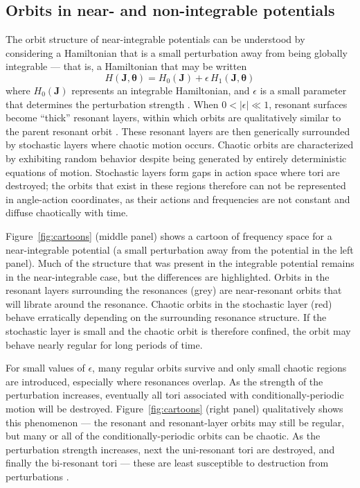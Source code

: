 \documentclass[letterpaper,12pt,preprint]{aastex}
\newcommand{\bs}[1]{\boldsymbol{#1}}
\begin{document}
\subsection{Orbits in near- and non-integrable potentials}

The orbit structure of near-integrable potentials can be understood by considering a Hamiltonian that is a small perturbation away from being globally integrable --- that is, a Hamiltonian that may be written
\begin{equation}
	H(\boldsymbol{J}, \boldsymbol{\theta}) = H_0(\boldsymbol{J}) + \epsilon \, H_1(\boldsymbol{J}, \boldsymbol{\theta})
\end{equation}
where $H_0(\bs{J})$ represents an integrable Hamiltonian, and $\epsilon$ is a small parameter that determines the perturbation strength \citep[a description of perturbation theory applied to nonlinear Hamiltonians is given in][]{lichtenberg83}. When $0 < |\epsilon| \ll 1$, resonant surfaces become ``thick'' resonant layers, within which orbits are qualitatively similar to the parent resonant orbit \citep[e.g.,][]{merritt99}. These resonant layers are then generically surrounded by stochastic layers where chaotic motion occurs. Chaotic orbits are characterized by exhibiting random behavior despite being generated by entirely deterministic equations of motion. Stochastic layers form gaps in action space where tori are destroyed; the orbits that exist in these regions therefore can not be represented in angle-action coordinates, as their actions and frequencies are not constant and diffuse chaotically with time. 

Figure~\ref{fig:cartoons} (middle panel) shows a cartoon of frequency space for a near-integrable potential (a small perturbation away from the potential in the left panel). Much of the structure that was present in the integrable potential remains in the near-integrable case, but the differences are highlighted. Orbits in the resonant layers surrounding the resonances (grey) are near-resonant orbits that will librate around the resonance. Chaotic orbits in the stochastic layer (red) behave erratically depending on the surrounding resonance structure. If the stochastic layer is small and the chaotic orbit is therefore confined, the orbit may behave nearly regular for long periods of time.

For small values of $\epsilon$, many regular orbits survive and only small chaotic regions are introduced, especially where resonances overlap. As the strength of the perturbation increases, eventually all tori associated with conditionally-periodic motion will be destroyed. Figure~\ref{fig:cartoons} (right panel) qualitatively shows this phenomenon --- the resonant and resonant-layer orbits may still be regular, but many or all of the conditionally-periodic orbits can be chaotic. As the perturbation strength increases, next the uni-resonant tori are destroyed, and finally the bi-resonant tori --- these are least susceptible to destruction from perturbations \cite[for a more quantitative illustration of this transition from integrability to global chaos, see Figure~9 in][]{valluri98}.
\end{document}
